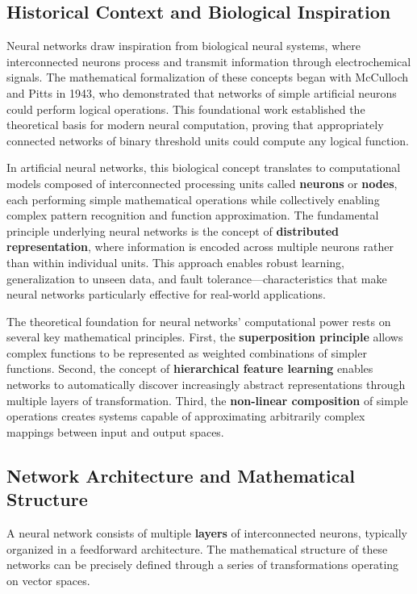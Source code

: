 \documentclass[11pt,a4paper]{report}
\begin{document}
\subsection{Historical Context and Biological Inspiration}

Neural networks draw inspiration from biological neural systems, where interconnected neurons process and transmit information through electrochemical signals. The mathematical formalization of these concepts began with McCulloch and Pitts in 1943, who demonstrated that networks of simple artificial neurons could perform logical operations. This foundational work established the theoretical basis for modern neural computation, proving that appropriately connected networks of binary threshold units could compute any logical function.

In artificial neural networks, this biological concept translates to computational models composed of interconnected processing units called \textbf{neurons} or \textbf{nodes}, each performing simple mathematical operations while collectively enabling complex pattern recognition and function approximation. The fundamental principle underlying neural networks is the concept of \textbf{distributed representation}, where information is encoded across multiple neurons rather than within individual units. This approach enables robust learning, generalization to unseen data, and fault tolerance—characteristics that make neural networks particularly effective for real-world applications.

The theoretical foundation for neural networks' computational power rests on several key mathematical principles. First, the \textbf{superposition principle} allows complex functions to be represented as weighted combinations of simpler functions. Second, the concept of \textbf{hierarchical feature learning} enables networks to automatically discover increasingly abstract representations through multiple layers of transformation. Third, the \textbf{non-linear composition} of simple operations creates systems capable of approximating arbitrarily complex mappings between input and output spaces.

\subsection{Network Architecture and Mathematical Structure}

A neural network consists of multiple \textbf{layers} of interconnected neurons, typically organized in a feedforward architecture. The mathematical structure of these networks can be precisely defined through a series of transformations operating on vector spaces.
\end{document}
